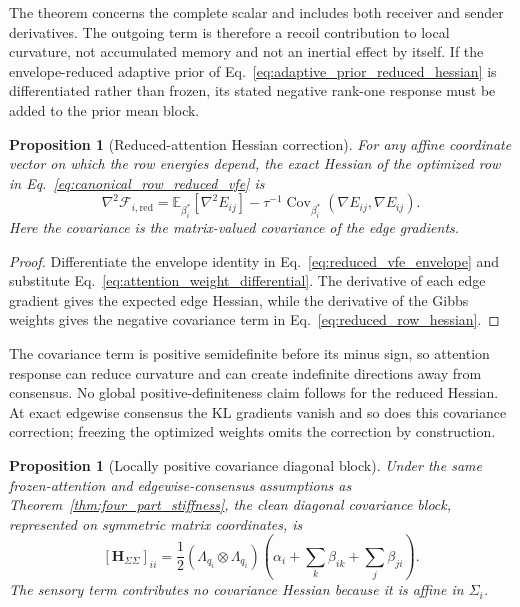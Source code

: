 \documentclass[12pt]{article}
\newtheorem{proposition}[theorem]{Proposition}
\begin{document}
The theorem concerns the complete scalar and includes both receiver and sender derivatives. The outgoing term is therefore a recoil contribution to local curvature, not accumulated memory and not an inertial effect by itself. If the envelope-reduced adaptive prior of Eq.~\eqref{eq:adaptive_prior_reduced_hessian} is differentiated rather than frozen, its stated negative rank-one response must be added to the prior mean block.

\begin{proposition}[Reduced-attention Hessian correction]
\label{prop:reduced_attention_hessian}
For any affine coordinate vector on which the row energies depend, the exact Hessian of the optimized row in Eq.~\eqref{eq:canonical_row_reduced_vfe} is
\begin{equation}
\boxed{
\nabla^2\mathcal F_{i,\mathrm{red}}
=\mathbb E_{\beta_i^*}[\nabla^2E_{ij}]
-\tau^{-1}\operatorname{Cov}_{\beta_i^*}
(\nabla E_{ij},\nabla E_{ij}).}
\label{eq:reduced_row_hessian}
\end{equation}
Here the covariance is the matrix-valued covariance of the edge gradients.
\end{proposition}

\begin{proof}
Differentiate the envelope identity in Eq.~\eqref{eq:reduced_vfe_envelope} and substitute Eq.~\eqref{eq:attention_weight_differential}. The derivative of each edge gradient gives the expected edge Hessian, while the derivative of the Gibbs weights gives the negative covariance term in Eq.~\eqref{eq:reduced_row_hessian}.
\end{proof}

The covariance term is positive semidefinite before its minus sign, so attention response can reduce curvature and can create indefinite directions away from consensus. No global positive-definiteness claim follows for the reduced Hessian. At exact edgewise consensus the KL gradients vanish and so does this covariance correction; freezing the optimized weights omits the correction by construction.

\begin{proposition}[Locally positive covariance diagonal block]
\label{prop:covariance_stiffness}
Under the same frozen-attention and edgewise-consensus assumptions as Theorem~\ref{thm:four_part_stiffness}, the clean diagonal covariance block, represented on symmetric matrix coordinates, is
\begin{equation}
\boxed{
[\mathbf H_{\Sigma\Sigma}]_{ii}
=\frac12(\Lambda_{q_i}\otimes\Lambda_{q_i})
\left(\alpha_i+\sum_k\beta_{ik}+\sum_j\beta_{ji}\right).}
\label{eq:stiffness_covariance}
\end{equation}
The sensory term contributes no covariance Hessian because it is affine in $\Sigma_i$.
\end{proposition}
\end{document}
